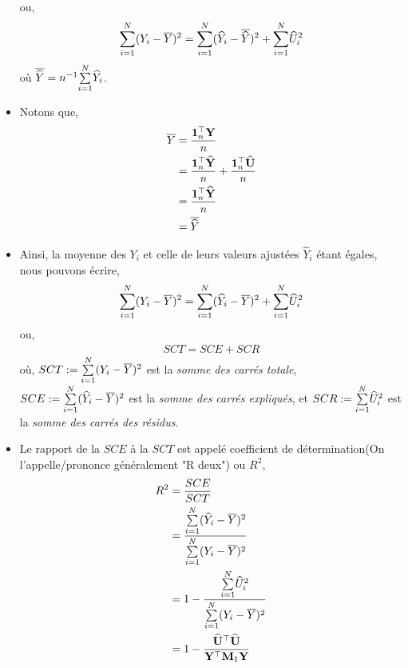 \begin{frame}[allowframebreaks]
\begin{itemize}
ou,
\begin{align*}
\underset{i=1}{\overset{N}{\sum}}(Y_i-\overline{Y})^2 = \underset{i=1}{\overset{N}{\sum}}(\widehat{Y}_i - \overline{\widehat{Y}})^2 + \underset{i=1}{\overset{N}{\sum}} \widehat{U}_i^2
\end{align*}
où $\overline{\widehat{Y}} = n^{-1}\underset{i=1}{\overset{N}{\sum}} \widehat{Y}_i$. 
\item Notons que,
\begin{align*}
\overline{Y} &= \frac{\mathbf{1}_n^\top\mathbf{Y}}{n} \\
&= \frac{\mathbf{1}_n^\top\widehat{\mathbf{Y}}}{n}
+ \frac{\mathbf{1}_n^\top\widehat{\mathbf{U}}}{n}\\
& = \frac{\mathbf{1}_n^\top\widehat{\mathbf{Y}}}{n} \\
&= \overline{\widehat{Y}}
\end{align*}
\item Ainsi, la moyenne des $Y_i$ et celle de leurs valeurs ajustées $\widehat{Y}_i$ étant égales, nous pouvons écrire,
\begin{align*}
\underset{i=1}{\overset{N}{\sum}}(Y_i-\overline{Y})^2 = \underset{i=1}{\overset{N}{\sum}}(\widehat{Y}_i - \overline{Y})^2 + \underset{i=1}{\overset{N}{\sum}} \widehat{U}_i^2
\end{align*}
ou,
\begin{align*}
SCT = SCE + SCR
\end{align*}
où,
$SCT := \underset{i=1}{\overset{N}{\sum}}(Y_i-\overline{Y})^2$ est la \emph{somme des carrés totale},  $SCE :=  \underset{i=1}{\overset{N}{\sum}}(\widehat{Y}_i - \overline{Y})^2$  est la \emph{somme des carrés expliqués}, et $SCR:= \underset{i=1}{\overset{N}{\sum}} \widehat{U}_i^2$ est la \emph{somme des carrés des résidus}.
\item Le rapport de la $SCE$ à la $SCT$ est appelé coefficient de détermination(On l'appelle/prononce généralement "R deux") ou $R^2$,
\begin{align*}
R^2 &= \frac{SCE}{SCT}\\
& = \frac{ \underset{i=1}{\overset{N}{\sum}}(\widehat{Y}_i - \overline{Y})^2}{\underset{i=1}{\overset{N}{\sum}}(Y_i-\overline{Y})^2}\\
&=1 - \frac{\underset{i=1}{\overset{N}{\sum}} \widehat{U}_i^2}{\underset{i=1}{\overset{N}{\sum}}(Y_i-\overline{Y})^2}\\
& = 1 - \frac{\widehat{\mathbf{U}}^\top\widehat{\mathbf{U}}}{\mathbf{Y}^\top\mathbf{M}_1\mathbf{Y}}
\end{align*}
\end{itemize}
\end{frame}

